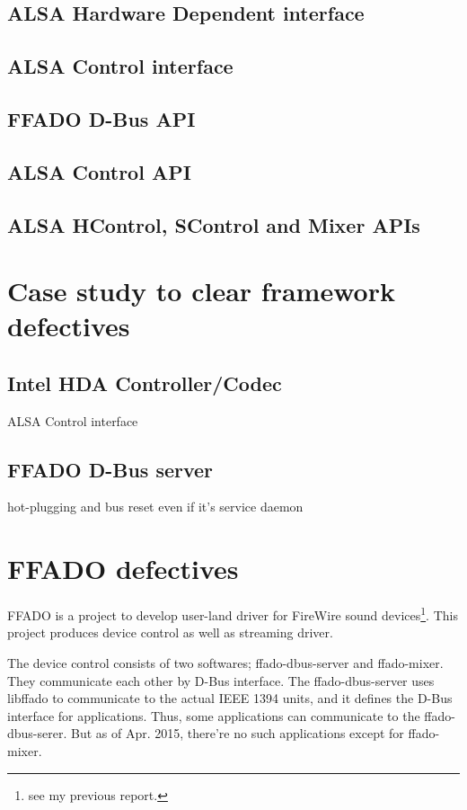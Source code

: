 \documentclass[onecolumn]{article}
\begin{document}
\subsection{ALSA Hardware Dependent interface}
\subsection{ALSA Control interface}
\subsection{FFADO D-Bus API}
\subsection{ALSA Control API}
\subsection{ALSA HControl, SControl and Mixer APIs}


\section{Case study to clear framework defectives}

\subsection{Intel HDA Controller/Codec}

ALSA Control interface

\subsection{FFADO D-Bus server}

hot-plugging and bus reset even if it's service daemon


\section{FFADO defectives}

FFADO is a project to develop user-land driver for FireWire sound devices\footnote{see my previous report.}. This project produces device control as well as streaming driver.

The device control consists of two softwares; ffado-dbus-server and ffado-mixer. They communicate each other by D-Bus interface. The ffado-dbus-server uses libffado to communicate to the actual IEEE 1394 units, and it defines the D-Bus interface for applications. Thus, some applications can communicate to the ffado-dbus-serer. But as of Apr. 2015, there're no such applications except for ffado-mixer.
\end{document}
